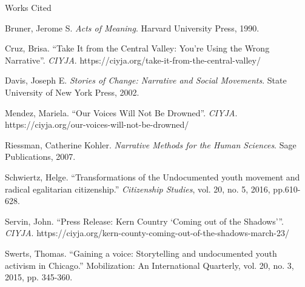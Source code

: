 \documentclass[12pt]{article}
\newcommand{\bibent}{\noindent \hangindent 40pt}
\newenvironment{workscited}{\newpage \begin{center} Works Cited \end{center}}{\newpage }
\begin{document}
\begin{flushleft}
\begin{workscited}

\bibent
Bruner, Jerome S. \textit{Acts of Meaning}. Harvard University Press, 1990.

\bibent
Cruz, Brisa. ``Take It from the Central Valley: You're Using the Wrong Narrative''. \textit{CIYJA}. https://ciyja.org/take-it-from-the-central-valley/

\bibent
Davis, Joseph E. \textit{Stories of Change: Narrative and Social Movements}. State University of New York Press, 2002.

\bibent
Mendez, Mariela. ``Our Voices Will Not Be Drowned''. \textit{CIYJA}. https://ciyja.org/our-voices-will-not-be-drowned/

\bibent
Riessman, Catherine Kohler. \textit{Narrative Methods for the Human Sciences}. Sage Publications, 2007.

\bibent
Schwiertz, Helge. ``Transformations of the Undocumented youth movement and radical egalitarian citizenship.'' \textit{Citizenship Studies}, vol. 20, no. 5, 2016, pp.610-628.

\bibent
Servin, John. ``Press Release: Kern Country `Coming out of the Shadows'''. \textit{CIYJA}. https://ciyja.org/kern-county-coming-out-of-the-shadows-march-23/

\bibent
Swerts, Thomas. “Gaining a voice: Storytelling and undocumented youth activism in Chicago.” Mobilization: An International Quarterly, vol. 20, no. 3, 2015, pp. 345-360.



\end{workscited}

\end{flushleft}
\end{document}
